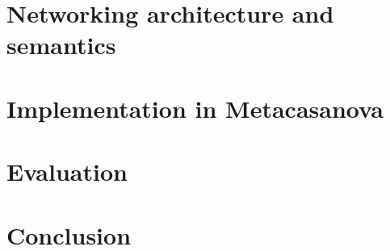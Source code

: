 \documentclass[runningheads,a4paper]{llncs}
\begin{document}
\section{Networking architecture and semantics}


\section{Implementation in Metacasanova}


\section{Evaluation}


\section{Conclusion}




\end{document}

